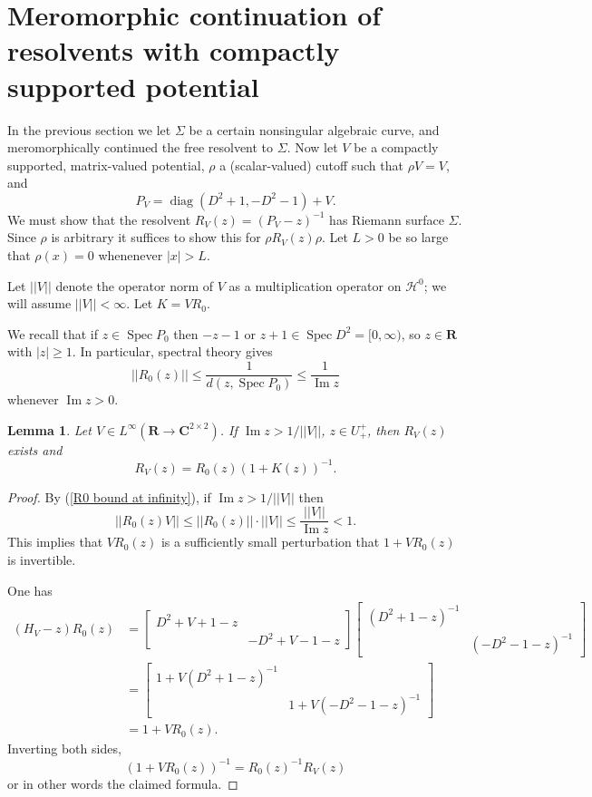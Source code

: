 \documentclass[reqno,12pt,letterpaper]{amsart}
\newcommand{\RR}{\mathbf{R}}
\newcommand{\CC}{\mathbf{C}}
\DeclareMathOperator{\diag}{diag}
\DeclareMathOperator{\Spec}{Spec}
\renewcommand{\Im}{\operatorname{Im}}
\newtheorem{lemma}[theorem]{Lemma}
\theoremstyle{definition}
\begin{document}
\section{Meromorphic continuation of resolvents with compactly supported potential}
In the previous section  we let $\Sigma$ be a certain nonsingular algebraic curve, and meromorphically continued the free resolvent to $\Sigma$.
Now let $V$ be a compactly supported, matrix-valued potential, $\rho$ a (scalar-valued) cutoff such that $\rho V = V$, and
$$P_V = \diag(D^2 + 1, -D^2 - 1) + V.$$
We must show that the resolvent $R_V(z) = (P_V - z)^{-1}$ has Riemann surface $\Sigma$.
Since $\rho$ is arbitrary it suffices to show this for $\rho R_V(z) \rho$.
Let $L > 0$ be so large that $\rho(x) = 0$ whenenever $|x| > L$.

Let $||V||$ denote the operator norm of $V$ as a multiplication operator on $\mathcal H^0$; we will assume $||V|| < \infty$.
Let $K = VR_0$.

We recall that if $z \in \Spec P_0$ then $-z - 1$ or $z + 1 \in \Spec D^2 = [0, \infty)$, so $z \in \RR$ with $|z| \geq 1$.
In particular, spectral theory gives
\begin{equation}
\label{R0 bound at infinity}
||R_0(z)|| \leq \frac{1}{d(z, \Spec P_0)} \leq \frac{1}{\Im z}
\end{equation}
whenever $\Im z > 0$.

\begin{lemma}
Let $V \in L^\infty(\RR \to \CC^{2 \times 2})$.
If $\Im z > 1/||V||$, $z \in U^+_+$, then $R_V(z)$ exists and
\begin{equation}
\label{resolvent equation}
R_V(z) = R_0(z)(1 + K(z))^{-1}.
\end{equation}
\end{lemma}
\begin{proof}
By (\ref{R0 bound at infinity}), if $\Im z > 1/||V||$ then
$$||R_0(z)V|| \leq ||R_0(z)||\cdot ||V|| \leq \frac{||V||}{\Im z} < 1.$$
This implies that $VR_0(z)$ is a sufficiently small perturbation that $1 + VR_0(z)$ is invertible.

One has
\begin{align*}(H_V - z)R_0(z) &= \begin{bmatrix}D^2 + V + 1 - z\\& -D^2 + V - 1 - z\end{bmatrix}\begin{bmatrix}(D^2 + 1 - z)^{-1}\\&(-D^2-1-z)^{-1}\end{bmatrix}\\
 &= \begin{bmatrix}1 + V(D^2 + 1 - z)^{-1}\\&1 + V(-D^2 - 1 - z)^{-1}\end{bmatrix}
 \\& = 1 + VR_0(z).
 \end{align*}
Inverting both sides,
$$(1 + VR_0(z))^{-1} = R_0(z)^{-1}R_V(z)$$
or in other words the claimed formula.
\end{proof}
\end{document}
